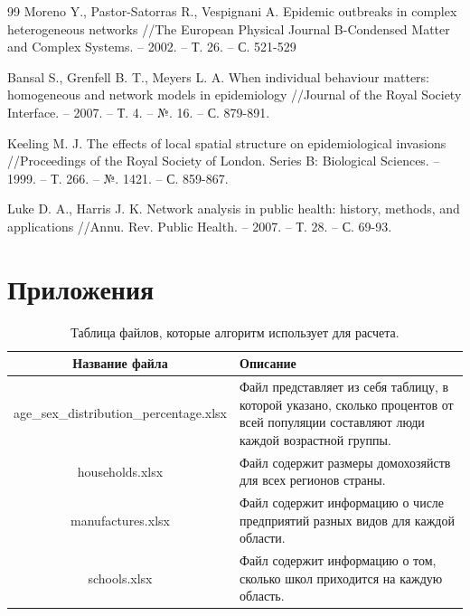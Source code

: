 \documentclass[14pt,a4paper]{article}
\begin{document}
\begin{thebibliography}{99}
	Moreno Y., Pastor-Satorras R., Vespignani A. Epidemic outbreaks in complex heterogeneous networks //The European Physical Journal B-Condensed Matter and Complex Systems. – 2002. – Т. 26. – С. 521-529
	
	Bansal S., Grenfell B. T., Meyers L. A. When individual behaviour matters: homogeneous and network models in epidemiology //Journal of the Royal Society Interface. – 2007. – Т. 4. – №. 16. – С. 879-891.
	
	
	Keeling M. J. The effects of local spatial structure on epidemiological invasions //Proceedings of the Royal Society of London. Series B: Biological Sciences. – 1999. – Т. 266. – №. 1421. – С. 859-867.
	
	Luke D. A., Harris J. K. Network analysis in public health: history, methods, and applications //Annu. Rev. Public Health. – 2007. – Т. 28. – С. 69-93.
	

\end{thebibliography}


\newpage


\section{Приложения}


\begin{table}[h]
	\centering
	\begin{tabularx}{\textwidth}{|c|X|}
		\hline
		Название файла & Описание \\ 
		\hline
		age\_sex\_distribution\_percentage.xlsx & Файл представляет из себя таблицу, в которой указано, сколько процентов от всей популяции составляют люди каждой возрастной группы. \\ 
		\hline
		households.xlsx & Файл содержит размеры домохозяйств для всех регионов страны. \\ 
		\hline
		manufactures.xlsx & Файл содержит информацию о числе предприятий разных видов для каждой области. \\ 
		\hline
		schools.xlsx & Файл содержит информацию о том, сколько школ приходится на каждую область. \\ 
		\hline
	\end{tabularx}
	\label{fig:file}
	\caption{Таблица файлов, которые алгоритм использует для расчета.}
\end{table}
\end{document}
